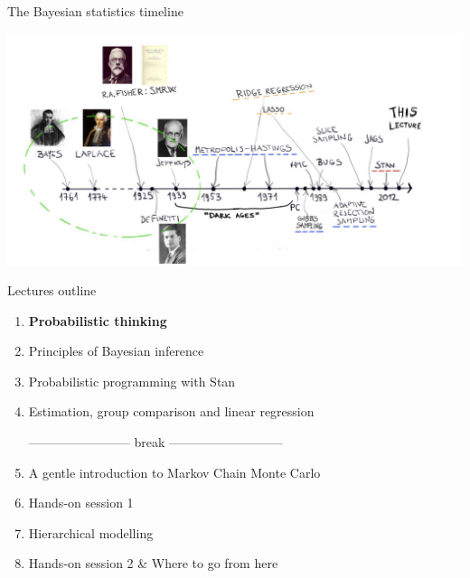 \begin{frame}{The Bayesian statistics timeline}
\begin{center}
\includegraphics[width=0.99\linewidth]{../LectureAssets/L00/timeline}
\end{center}
\end{frame}

\begin{frame}{Lectures outline}

\begin{enumerate}

\item \textbf{Probabilistic thinking}

\item Principles of Bayesian inference

\item Probabilistic programming with Stan

\item Estimation, group comparison and linear regression

\smallskip

------------------------ break ---------------------------

\item A gentle introduction to Markov Chain Monte Carlo

\item Hands-on session 1

\item Hierarchical modelling

\item Hands-on session 2 \& Where to go from here
\end{enumerate}
\end{frame}


